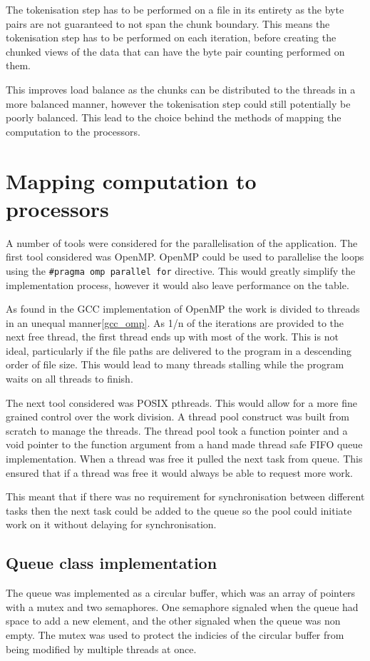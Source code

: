 \documentclass{article}
\begin{document}
The tokenisation step has to be performed on a file in its entirety as the byte pairs are not guaranteed to not 
span the chunk boundary. This means the tokenisation step has to be performed on each iteration, before creating 
the chunked views of the data that can have the byte pair counting performed on them. 

This improves load balance as the chunks can be distributed to the threads in a more balanced manner, however the
tokenisation step could still potentially be poorly balanced. This lead to the choice behind the methods of 
mapping the computation to the processors.

\section{Mapping computation to processors}
A number of tools were considered for the parallelisation of the application. The first tool considered was OpenMP.
OpenMP could be used to parallelise the loops using the \texttt{#pragma omp parallel for} directive. 
This would greatly simplify the implementation process, however it would also leave performance on the table.

As found in the GCC implementation of OpenMP the work is divided to threads in an unequal manner\ref{gcc_omp}.
As 1/n of the iterations are provided to the next free thread, the first thread ends up with most of the work.
This is not ideal, particularly if the file paths are delivered to the program in a descending order of file size.
This would lead to many threads stalling while the program waits on all threads to finish.

The next tool considered was POSIX pthreads. This would allow for a more fine grained control over the work 
division. A thread pool construct was built from scratch to manage the threads. The thread pool took a function pointer
and a void pointer to the function argument from a hand made thread safe FIFO queue implementation. 
When a thread was free it pulled the next task from queue. This ensured that if a thread was free it would 
always be able to request more work.

This meant that if there was no requirement for synchronisation between different tasks then the next task could 
be added to the queue so the pool could initiate work on it without delaying for synchronisation.


\subsection{Queue class implementation}
The queue was implemented as a circular buffer, which was an array of pointers with a mutex and two semaphores. One semaphore signaled when 
the queue had space to add a new element, and the other signaled when the queue was non empty. The mutex was used
to protect the indicies of the circular buffer from being modified by multiple threads at once.
\end{document}
